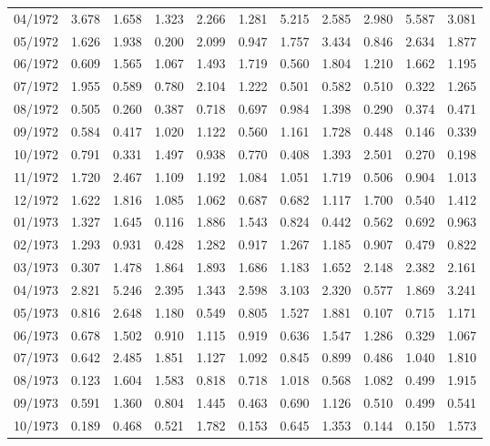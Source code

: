 \begin{tabular}{lrrrrrrrrrr}
04/1972 &  3.678 &  1.658 &  1.323 &  2.266 &  1.281 &  5.215 &  2.585 &  2.980 &  5.587 &  3.081 \\
05/1972 &  1.626 &  1.938 &  0.200 &  2.099 &  0.947 &  1.757 &  3.434 &  0.846 &  2.634 &  1.877 \\
06/1972 &  0.609 &  1.565 &  1.067 &  1.493 &  1.719 &  0.560 &  1.804 &  1.210 &  1.662 &  1.195 \\
07/1972 &  1.955 &  0.589 &  0.780 &  2.104 &  1.222 &  0.501 &  0.582 &  0.510 &  0.322 &  1.265 \\
08/1972 &  0.505 &  0.260 &  0.387 &  0.718 &  0.697 &  0.984 &  1.398 &  0.290 &  0.374 &  0.471 \\
09/1972 &  0.584 &  0.417 &  1.020 &  1.122 &  0.560 &  1.161 &  1.728 &  0.448 &  0.146 &  0.339 \\
10/1972 &  0.791 &  0.331 &  1.497 &  0.938 &  0.770 &  0.408 &  1.393 &  2.501 &  0.270 &  0.198 \\
11/1972 &  1.720 &  2.467 &  1.109 &  1.192 &  1.084 &  1.051 &  1.719 &  0.506 &  0.904 &  1.013 \\
12/1972 &  1.622 &  1.816 &  1.085 &  1.062 &  0.687 &  0.682 &  1.117 &  1.700 &  0.540 &  1.412 \\
01/1973 &  1.327 &  1.645 &  0.116 &  1.886 &  1.543 &  0.824 &  0.442 &  0.562 &  0.692 &  0.963 \\
02/1973 &  1.293 &  0.931 &  0.428 &  1.282 &  0.917 &  1.267 &  1.185 &  0.907 &  0.479 &  0.822 \\
03/1973 &  0.307 &  1.478 &  1.864 &  1.893 &  1.686 &  1.183 &  1.652 &  2.148 &  2.382 &  2.161 \\
04/1973 &  2.821 &  5.246 &  2.395 &  1.343 &  2.598 &  3.103 &  2.320 &  0.577 &  1.869 &  3.241 \\
05/1973 &  0.816 &  2.648 &  1.180 &  0.549 &  0.805 &  1.527 &  1.881 &  0.107 &  0.715 &  1.171 \\
06/1973 &  0.678 &  1.502 &  0.910 &  1.115 &  0.919 &  0.636 &  1.547 &  1.286 &  0.329 &  1.067 \\
07/1973 &  0.642 &  2.485 &  1.851 &  1.127 &  1.092 &  0.845 &  0.899 &  0.486 &  1.040 &  1.810 \\
08/1973 &  0.123 &  1.604 &  1.583 &  0.818 &  0.718 &  1.018 &  0.568 &  1.082 &  0.499 &  1.915 \\
09/1973 &  0.591 &  1.360 &  0.804 &  1.445 &  0.463 &  0.690 &  1.126 &  0.510 &  0.499 &  0.541 \\
10/1973 &  0.189 &  0.468 &  0.521 &  1.782 &  0.153 &  0.645 &  1.353 &  0.144 &  0.150 &  1.573 \\

\end{tabular}
